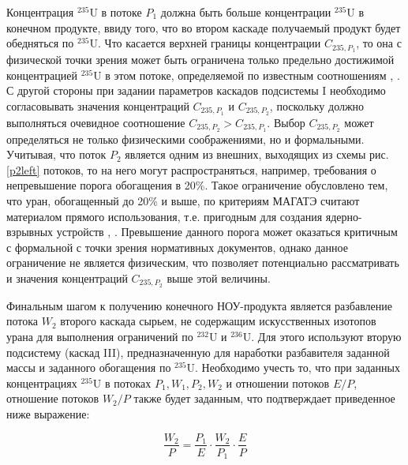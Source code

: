 Концентрация $^{235}$U в потоке $P_1$ должна быть больше концентрации $^{235}$U в конечном продукте, ввиду того, что во втором каскаде получаемый продукт будет обедняться по $^{235}$U. Что касается верхней границы концентрации ${C}_{235,{P_1}}$, то она с физической точки зрения может быть ограничена только предельно достижимой концентрацией $^{235}$U в этом потоке, определяемой по известным соотношениям \cite{sulaberidzeOsobennostiObogashcheniyaKomponentov2006}, \cite{minenkoPredelnoeObogashcheniePromezhutochnyh1972}. С другой стороны при задании параметров каскадов подсистемы I необходимо согласовывать значения концентраций ${C}_{235,{P_1}}$ и ${C}_{235,{P_2}}$, поскольку должно выполняться очевидное соотношение ${C}_{235,{P_2}}{>}{C}_{235,{P_1}}$.
Выбор $C_{235,{P_2}}$ может определяться не только физическими соображениями, но и формальными. Учитывая, что поток $P_2$ является одним из внешних, выходящих из схемы рис. \ref{p2left} потоков, то на него могут распространяться, например, требования о непревышение порога обогащения в 20\%. Такое ограничение обусловлено тем, что уран, обогащенный до 20\% и выше, по критериям МАГАТЭ считают материалом прямого использования, т.е. пригодным для создания ядерно-взрывных устройств \cite{brownOriginsSignificanceLimit2016}, \cite{pshakinYadernoeNerasprostranenie2006}. Превышение данного порога может оказаться критичным с формальной с точки зрения нормативных документов, однако данное ограничение не является физическим, что позволяет потенциально рассматривать и значения концентраций  $C_{235,{P_2}}$ выше этой величины. 

Финальным шагом к получению конечного НОУ-продукта является разбавление потока $W_2$ второго каскада сырьем, не содержащим искусственных изотопов урана для выполнения ограничений по $^{232}$U и $^{236}$U.
Для этого используют вторую подсистему (каскад III), предназначенную для наработки разбавителя заданной массы и заданного обогащения по $^{235}$U.
Необходимо учесть то, что при заданных концентрациях $^{235}$U в потоках ${P_1}, {W_1}, {P_2}, {W_2}$ и отношении потоков $E/P$, отношение потоков ${W_2}{/P}$ также будет заданным, что подтверждает приведенное ниже выражение:

\begin{equation}
    \label{dc1}
    \frac{W_{2}}{P}=\frac{P_{1}}{E}\cdot\frac{W_{2}}{P_{1}}\cdot\frac{E}{P}
\end{equation}

